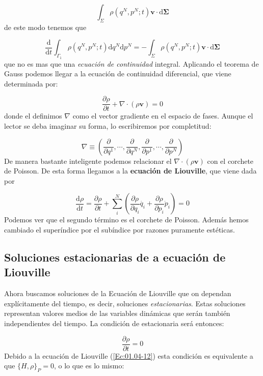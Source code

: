 \documentclass[12pt,a4paper]{article}
\numberwithin{equation}{section}
\numberwithin{figure}{section}
\newcommand{\parentesis}[1]{\left( #1  \right)}
\newcommand{\parciales}[2]{\frac{\partial #1}{\partial #2}}
\newcommand{\D}{\mathrm{d}}
\newcommand{\derivadas}[2]{\frac{\D #1}{\D #2}}
\newcommand{\vn}{\mathbf{v}}
\newcommand{\Sigman}{\boldsymbol{\Sigma}}
\theoremstyle{definition}
\begin{document}
\begin{equation}
\int_\Sigma \rho (q^N,p^N;t) \vn \cdot \D \Sigman
\end{equation}
de este modo tenemos que

\begin{equation}
\derivadas{}{t} \int_{\Gamma_1} \rho(q^N,p^N;t) \D q^N \D p^N  = -
\int_\Sigma \rho (q^N,p^N;t) \vn \cdot \D \Sigman
\end{equation}
que no es mas que una \textit{ecuación de continuidad} integral. Aplicando el teorema de Gauss podemos llegar a la ecuación de continuidad diferencial, que viene determinada por:

\begin{equation}
\parciales{\rho}{t} + \nabla \cdot (\rho \vn) = 0
\end{equation}
donde el definimos $\nabla$ como el vector gradiente en el espacio de fases. Aunque el lector se deba imaginar su forma, lo escribiremos por completitud:

\begin{equation}
\nabla \equiv \parentesis{\parciales{}{q^1}, \cdots,\parciales{}{q^N},\parciales{}{p^1}, \cdots,\parciales{}{p^N}}
\end{equation}
De manera bastante inteligente podemos relacionar el $\nabla \cdot (\rho \vn)$ con el corchete de Poisson. De esta forma llegamos a la \textbf{ecuación de Liouville}, que viene dada por

\begin{equation}
\derivadas{\rho}{t} = \parciales{\rho}{t} + \sum_i^N \parentesis{\parciales{\rho}{q_i} \dot{q_i} + \parciales{\rho}{p_i}\dot{p}_i} = 0 \label{Ec:01.04-12}
\end{equation}
Podemos ver que el segundo término es el corchete de Poisson. Además hemos cambiado el superíndice por el subíndice por razones puramente estéticas. 

\subsection{Soluciones estacionarias de a ecuación de Liouville}

Ahora buscamos soluciones de la Ecuación de Liouville que on dependan explícitamente del tiempo, es decir, soluciones \textit{estacionarias}. Estas soluciones representan valores medios de las variables dinámicas que serán también independientes del tiempo. La condición de estacionaria será entonces:

\begin{equation}
\parciales{\rho}{t} = 0 
\end{equation}
Debido a la ecuación de Liouville (\ref{Ec:01.04-12}) esta condición es equivalente a que $\{ H,\rho \}_P=0$, o lo que es lo mismo:
\end{document}
